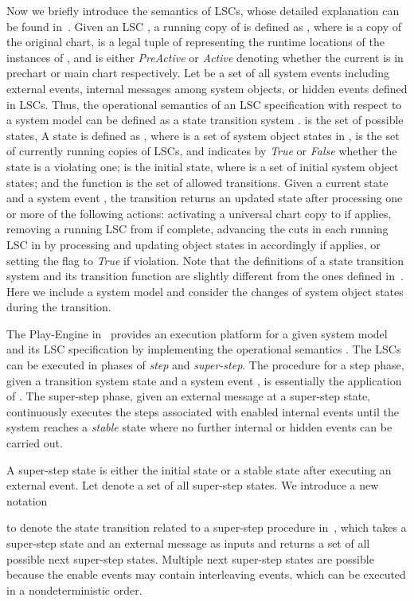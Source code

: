 \documentclass[]{llncs}
\begin{document}
Now we briefly introduce the semantics of LSCs,
whose detailed explanation can be found in~\cite{HM03}.
Given an LSC , a running copy of  is defined as
, where  is a copy of the
original chart,
 is a legal tuple of  representing
the runtime locations of the instances of ,
and  is either {\em PreActive} or
{\em Active} denoting whether the current 
is in prechart or main chart respectively.
Let  be a set of all system events including
external events, internal messages among system objects, or
hidden events defined in LSCs.
Thus, the operational semantics of an LSC specification
 with respect to a system model  can be defined as a state
transition system .
 is the set of possible states,
A state  is defined as
, where
 is a set of system object states in ,
 is the set of currently running copies of LSCs, and  indicates
by {\em True} or {\em False} whether the state is a violating one;
 is the initial state, where
 is a set of initial system object states; and
the function  is
the set of allowed transitions.
Given a current state  and a system event
, the transition  returns an updated state after
processing one or more of the following actions:
activating a universal chart copy to  if applies,
removing a running LSC from  if complete,
advancing the cuts in each running LSC in  by processing 
and updating object states in  accordingly if applies, or setting the flag
 to {\em True} if violation.
Note that the definitions of a state transition system  and its transition
function  are slightly different from the ones defined in~\cite{HM03}.
Here we include a system model  and consider the changes of system object states
during the transition.

The Play-Engine in~\cite{HM03} provides an execution
platform for a given system model  and its LSC specification 
by implementing the operational semantics .
The LSCs can be executed in phases of {\em step} and
{\em super-step}. The procedure for a step phase, given a transition system
state  and a system event , is essentially the application of .
The super-step phase, given an external message  at a super-step state,
continuously executes the steps associated with enabled internal events
until the system reaches a {\em stable} state where
no further internal or hidden events can be carried out.

A super-step state is either the initial state  or a stable state after executing
an external event. Let  denote a set of all super-step states.
We introduce a new notation

to denote the state transition related to a super-step procedure in~\cite{HM03},
which takes a super-step state  and
an external message  as inputs and
returns a set of all possible next super-step states.
Multiple next super-step states are possible because the enable events
may contain interleaving events, which can be executed in a nondeterministic
order.
\end{document}
